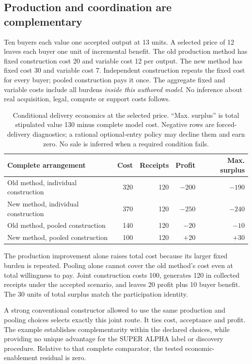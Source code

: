 \documentclass[11pt,letterpaper]{article}
\begin{document}
\subsection{Production and coordination are complementary}
Ten buyers each value one accepted output at 13 units. A selected price of 12 leaves each buyer one unit of incremental benefit. The old production method has fixed construction cost 20 and variable cost 12 per output. The new method has fixed cost 30 and variable cost 7. Independent construction repeats the fixed cost for every buyer; pooled construction pays it once. The aggregate fixed and variable costs include all burdens \emph{inside this authored model}. No inference about real acquisition, legal, compute or support costs follows.

\begin{table}[htbp]\centering\small
\begin{tabularx}{\linewidth}{@{}Yrrrr@{}}\toprule
Complete arrangement & Cost & Receipts & Profit & Max. surplus\\\midrule
Old method, individual construction & 320 & 120 & $-200$ & $-190$\\
New method, individual construction & 370 & 120 & $-250$ & $-240$\\
Old method, pooled construction & 140 & 120 & $-20$ & $-10$\\
New method, pooled construction & 100 & 120 & $+20$ & $+30$\\\bottomrule
\end{tabularx}
\caption{Conditional delivery economics at the selected price. ``Max. surplus'' is total stipulated value 130 minus complete model cost. Negative rows are forced-delivery diagnostics; a rational optional-entry policy may decline them and earn zero. No sale is inferred when a required condition fails.}\label{tab:arrangements}
\end{table}

The production improvement alone raises total cost because its larger fixed burden is repeated. Pooling alone cannot cover the old method's cost even at total willingness to pay. Joint construction costs 100, generates 120 in collected receipts under the accepted scenario, and leaves 20 profit plus 10 buyer benefit. The 30 units of total surplus match the participation identity.

A strong conventional constructor allowed to use the same production and pooling choices selects exactly this joint route. It ties cost, acceptance and profit. The example establishes complementarity within the declared choices, while providing no unique advantage for the SUPER ALPHA label or discovery procedure. Relative to that complete comparator, the tested economic-enablement residual is zero.
\end{document}
